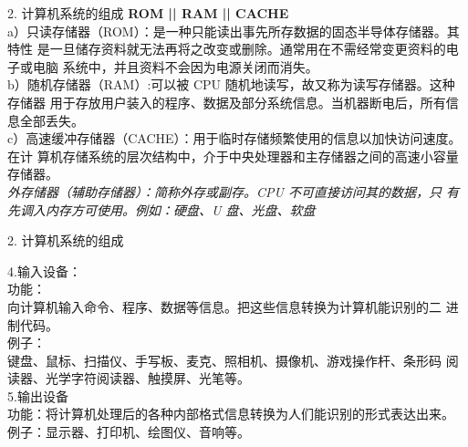 \documentclass[aspectratio=169]{beamer}
\begin{document}
\begin{frame}[t]{2. 计算机系统的组成} \vspace{20pt}
    \textbf{ROM || RAM || CACHE}\\
    a）只读存储器（ROM）：是一种只能读出事先所存数据的固态半导体存储器。其特性
是一旦储存资料就无法再将之改变或删除。通常用在不需经常变更资料的电子或电脑
系统中，并且资料不会因为电源关闭而消失。\\
b）随机存储器（RAM）:可以被 CPU 随机地读写，故又称为读写存储器。这种存储器
用于存放用户装入的程序、数据及部分系统信息。当机器断电后，所有信息全部丢失。\\
c）高速缓冲存储器（CACHE）：用于临时存储频繁使用的信息以加快访问速度。在计
算机存储系统的层次结构中，介于中央处理器和主存储器之间的高速小容量存储器。\\

\textit{外存储器（辅助存储器）：简称外存或副存。CPU 不可直接访问其的数据，只
有先调入内存方可使用。例如：硬盘、U 盘、光盘、软盘}\\
\end{frame}


\begin{frame}[t]{2. 计算机系统的组成} \vspace{20pt}
    
    4.输入设备：\\
    功能：\\
    向计算机输入命令、程序、数据等信息。把这些信息转换为计算机能识别的二
进制代码。\\

例子：\\
    键盘、鼠标、扫描仪、手写板、麦克、照相机、摄像机、游戏操作杆、条形码
阅读器、光学字符阅读器、触摸屏、光笔等。\\

5.输出设备\\
功能：将计算机处理后的各种内部格式信息转换为人们能识别的形式表达出来。\\
例子：显示器、打印机、绘图仪、音响等。\\
\end{frame}
\end{document}
